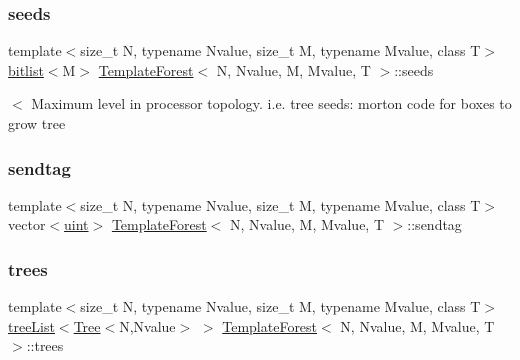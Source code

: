 \mbox{\label{classTemplateForest_a00983bdc218abbf105f872e3d2187e8a}} 
\subsubsection{\texorpdfstring{seeds}{seeds}}
{\footnotesize\ttfamily template$<$size\+\_\+t N, typename Nvalue, size\+\_\+t M, typename Mvalue, class T$>$ \\
\mbox{\hyperlink{definitions_8h_ad1cc49840e065ce2a93cd243916d310c}{bitlist}}$<$M$>$ \mbox{\hyperlink{classTemplateForest}{Template\+Forest}}$<$ N, Nvalue, M, Mvalue, T $>$\+::seeds\hspace{0.3cm}{\ttfamily [private]}}

$<$ Maximum level in processor topology. i.\+e. tree seeds\+: morton code for boxes to grow tree \mbox{\label{classTemplateForest_ae38bc6bd6cce20a9e93c5d854bca2a18}} 
\subsubsection{\texorpdfstring{sendtag}{sendtag}}
{\footnotesize\ttfamily template$<$size\+\_\+t N, typename Nvalue, size\+\_\+t M, typename Mvalue, class T$>$ \\
vector$<$\mbox{\hyperlink{definitions_8h_a69aa29b598b851b0640aa225a9e5d61d}{uint}}$>$ \mbox{\hyperlink{classTemplateForest}{Template\+Forest}}$<$ N, Nvalue, M, Mvalue, T $>$\+::sendtag\hspace{0.3cm}{\ttfamily [private]}}

\mbox{\label{classTemplateForest_a0399f34c2a5a887fc994657d128860bb}} 
\subsubsection{\texorpdfstring{trees}{trees}}
{\footnotesize\ttfamily template$<$size\+\_\+t N, typename Nvalue, size\+\_\+t M, typename Mvalue, class T$>$ \\
\mbox{\hyperlink{templateForest_8h_a7d5792f6e45225030ac74c936ce3b700}{tree\+List}}$<$\mbox{\hyperlink{classTree}{Tree}}$<$N,Nvalue$>$ $>$ \mbox{\hyperlink{classTemplateForest}{Template\+Forest}}$<$ N, Nvalue, M, Mvalue, T $>$\+::trees\hspace{0.3cm}{\ttfamily [private]}}

